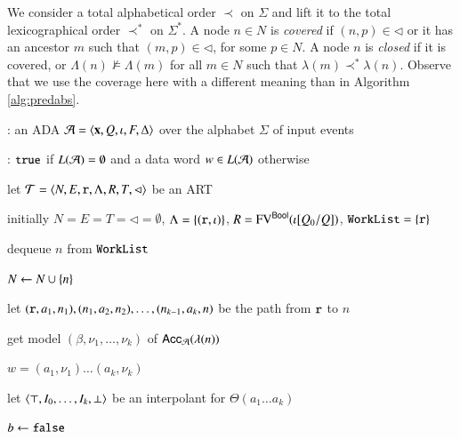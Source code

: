 \documentclass[10pt,conference,letterpaper,twocolumn]{IEEEtran}
\begin{document}
We consider a total alphabetical order $\prec$ on $\Sigma$ and lift it
to the total lexicographical order $\prec^*$ on $\Sigma^*$. A node $n
\in N$ is \emph{covered} if $(n,p) \in \lhd$ or it has an ancestor $m$
such that $(m,p) \in \lhd$, for some $p \in N$. A node $n$ is
\emph{closed} if it is covered, or $\Lambda(n) \not\models \Lambda(m)$
for all $m \in N$ such that $\lambda(m) \prec^* \lambda(n)$. Observe
that we use the coverage here with a different meaning than in
Algorithm \ref{alg:predabs}.

\begin{algorithm}[t!]
{\scriptsize\begin{algorithmic}[0]
  : an ADA $\mathcal{A} = \left\langle \mathbf x,Q,\iota,F,\Delta \right\rangle$
  over the alphabet $\Sigma$ of input events

  : $\mathtt{true}$ if $L(\mathcal{A})=\emptyset$ and a data word $w
  \in L(\mathcal{A})$ otherwise
\end{algorithmic}}

{\scriptsize\begin{algorithmic}[1] 

  \State let $\mathcal{T} = \left\langle N,E,\mathtt{r},\Lambda,R,T,\lhd \right\rangle$ be an ART

  \State initially $N = E = T = \lhd = \emptyset$, $\Lambda =
  \left\{ (\mathtt{r},\iota) \right\}$, $R = \mathrm{FV}^{\mathsf{Bool}}(\iota[Q_0/Q])$,
  $\mathtt{WorkList}=\left\{ \mathtt{r} \right\}$
  
  \While{$\worklist \neq \emptyset$}
  \label{ln:impact-while}

  \State dequeue $n$ from $\mathtt{WorkList}$ 
  \label{ln:impact-dequeue}

  \State $N \leftarrow N \cup \left\{ n \right\}$

  \State let $(\mathtt{r},a_1,n_1),(n_1,a_2,n_2), \ldots,
  (n_{k-1},a_k,n)$ be the path from $\mathtt{r}$ to $n$


  \State get model $(\beta,\nu_1,\ldots,\nu_k)$ of
  $\mathsf{Acc}_{\mathcal{A}}(\lambda(n))$

   $w = (a_1,\nu_1) \ldots (a_k,\nu_k)$
  \label{ln:impact-nonempty}

  \Else {}

  \State let $\left\langle \top,I_0,\ldots,I_k,\bot \right\rangle$ be an interpolant for
  $\Theta(a_1 \ldots a_k)$
  \label{ln:refine-begin}

  \State $b \leftarrow \mathtt{false}$


\end{algorithmic}}
\end{algorithm}
\end{document}

